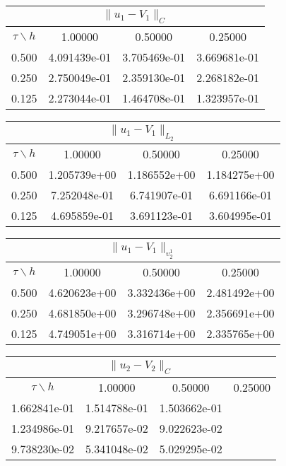 \begin{center}
\begin{tabular}{||c|c|c|c||}
\hline
\hline
\multicolumn{4}{||c||}{$\|u_1-V_1\| _{C}$}\\ 
\hline
\hline
$\tau \backslash h$ & 1.00000 & 0.50000 & 0.25000\\ 
\hline 
0.500& 4.091439e-01 &3.705469e-01 &3.669681e-01 \\
\hline
0.250& 2.750049e-01 &2.359130e-01 &2.268182e-01 \\ 
\hline
0.125& 2.273044e-01 &1.464708e-01 &1.323957e-01 \\ 
\hline
\hline
\end{tabular}
\end{center}
\begin{center}
\begin{tabular}{||c|c|c|c||}
\hline
\hline
\multicolumn{4}{||c||}{$\|u_1-V_1\| _{L_2}$}\\ 
\hline
\hline 
$\tau \backslash h$ & 1.00000 & 0.50000 & 0.25000\\ 
\hline 
0.500& 1.205739e+00 &1.186552e+00 &1.184275e+00 \\
\hline
0.250& 7.252048e-01 &6.741907e-01 &6.691166e-01 \\ 
\hline
0.125& 4.695859e-01 &3.691123e-01 &3.604995e-01 \\ 
\hline
\hline
\end{tabular}
\end{center}
\begin{center}
\begin{tabular}{||c|c|c|c||}
\hline
\hline
\multicolumn{4}{||c||}{$\|u_1-V_1\| _{v_2^1}$}\\ 
\hline
\hline
$\tau \backslash h$ & 1.00000 & 0.50000 & 0.25000\\ 
\hline 
0.500& 4.620623e+00 &3.332436e+00 &2.481492e+00 \\
\hline
0.250& 4.681850e+00 &3.296748e+00 &2.356691e+00 \\ 
\hline
0.125& 4.749051e+00 &3.316714e+00 &2.335765e+00 \\ 
\hline
\hline
\end{tabular}
\end{center}
\begin{center}
\begin{tabular}{||c|c|c|c||}
\hline
\hline
\multicolumn{4}{||c||}{$\|u_2-V_2\| _{C}$}\\ 
\hline
\hline 
$\tau \backslash h$ & 1.00000 & 0.50000 & 0.25000\\ 
\hline 
1.662841e-01 &1.514788e-01 &1.503662e-01 \\
\hline
1.234986e-01 &9.217657e-02 &9.022623e-02 \\ 
\hline
9.738230e-02 &5.341048e-02 &5.029295e-02 \\ 
\hline
\hline
\end{tabular}
\end{center}
